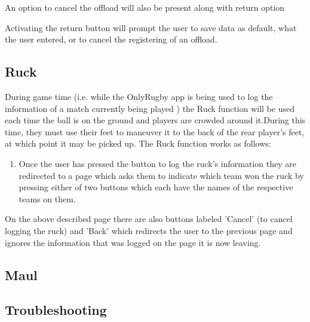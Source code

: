 \documentclass[hidelinks,a4paper,12pt]{article}
\begin{document}
		\item An option to cancel the offload will also be present along with return option
		\item Activating the return button will prompt the user to save data as default, what the user entered, or to cancel the registering of an offload.

	\subsection{Ruck}
		During game time (i.e. while the OnlyRugby app is being used to log the information of a match currently being played ) the Ruck function will be used each time the ball is on the ground and players are crowded around it.During this time, they must use their feet to maneuver it to the back of the rear player's feet, at which point it may be picked up. The Ruck function works as follows:
		\begin{enumerate}
			\item Once the user has pressed the button to log the ruck's information they are redirected to a page which asks them to indicate which
			team won the ruck by pressing either of two buttons which each have the names of the respective teams on them.
		\end{enumerate}
	On the above described page there are also buttons labeled 'Cancel' (to cancel logging the ruck) and 'Back' which redirects the user to the previous page and ignores the information that was logged on the page it is now leaving.

	\subsection{Maul}

\subsection{Troubleshooting}
		
\end{document}
